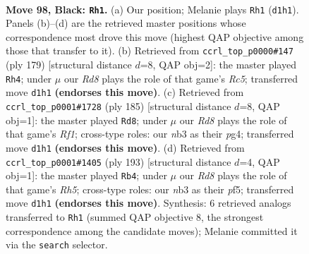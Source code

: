 \documentclass[11pt]{article}
\begin{document}
\clearpage

\begin{figure}[p]\centering
\begin{subfigure}{0.46\textwidth}\centering
\resizebox{\linewidth}{!}{%
\newchessgame
\chessboard[
  setfen={8/R7/3k4/5K2/8/1N6/6P1/3r4 b - - 61 98},
  showmover=false,
  pgfstyle=straightmove, color=movearrow, markmove={d1-h1}
]}
\caption{}
\end{subfigure}\hfill
\begin{subfigure}{0.46\textwidth}\centering
\resizebox{\linewidth}{!}{%
\newchessgame
\chessboard[
  setfen={2k5/8/8/8/2r5/1R6/4K3/8 b - - 11 90},
  showmover=false,
  pgfstyle=straightmove, color=movearrow, markmove={c4-h4}
]}
\caption{}
\end{subfigure}
\\[4pt]
\begin{subfigure}{0.46\textwidth}\centering
\resizebox{\linewidth}{!}{%
\newchessgame
\chessboard[
  setfen={5r2/8/2K2k2/1R6/2p3P1/8/8/8 b - - 10 93},
  showmover=false,
  pgfstyle=straightmove, color=movearrow, markmove={f8-d8}
]}
\caption{}
\end{subfigure}\hfill
\begin{subfigure}{0.46\textwidth}\centering
\resizebox{\linewidth}{!}{%
\newchessgame
\chessboard[
  setfen={8/3R4/5p1k/5P2/7r/5K2/8/8 b - - 7 97},
  showmover=false,
  pgfstyle=straightmove, color=movearrow, markmove={h4-b4}
]}
\caption{}
\end{subfigure}
\caption{\textbf{Move 98, Black: \texttt{Rh1}.} (a) Our position; Melanie plays \texttt{Rh1} (\texttt{d1h1}). Panels (b)--(d) are the retrieved master positions whose correspondence most drove this move (highest QAP objective among those that transfer to it). (b) Retrieved from \texttt{ccrl\_top\_p0000\#147} (ply 179) [structural distance $d$=8, QAP obj=2]: the master played \texttt{Rh4}; under $\mu$ our \emph{Rd8} plays the role of that game's \emph{Rc5}; transferred move \texttt{d1h1} \textbf{(endorses this move)}. (c) Retrieved from \texttt{ccrl\_top\_p0001\#1728} (ply 185) [structural distance $d$=8, QAP obj=1]: the master played \texttt{Rd8}; under $\mu$ our \emph{Rd8} plays the role of that game's \emph{Rf1}; cross-type roles: our \emph{n}b3 as their \emph{p}g4; transferred move \texttt{d1h1} \textbf{(endorses this move)}. (d) Retrieved from \texttt{ccrl\_top\_p0001\#1405} (ply 193) [structural distance $d$=4, QAP obj=1]: the master played \texttt{Rb4}; under $\mu$ our \emph{Rd8} plays the role of that game's \emph{Rh5}; cross-type roles: our \emph{n}b3 as their \emph{p}f5; transferred move \texttt{d1h1} \textbf{(endorses this move)}. Synthesis: 6 retrieved analogs transferred to \texttt{Rh1} (summed QAP objective 8, the strongest correspondence among the candidate moves); Melanie committed it via the \texttt{search} selector.}
\label{fig:thought-m195}
\end{figure}
\end{document}
